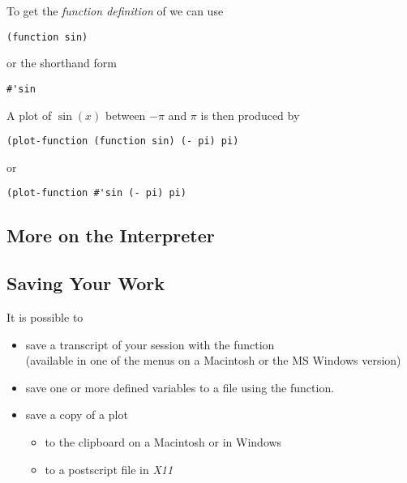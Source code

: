 \begin{slide}{}
To get the {\em function definition}\/ of  we can use
\begin{verbatim}
(function sin)
\end{verbatim}
or the shorthand form
\begin{verbatim}
#'sin
\end{verbatim}
A plot of $\sin(x)$ between $-\pi$ and $\pi$ is then produced by
{\Large
\begin{verbatim}
(plot-function (function sin) (- pi) pi)
\end{verbatim}}
or
{\Large
\begin{verbatim}
(plot-function #'sin (- pi) pi)
\end{verbatim}}
\end{slide}

\begin{slide}{}
\section{More on the Interpreter}
\subsection{Saving Your Work}
It is possible to
\begin{itemize}
\item
save a transcript of your session with the  function\\
(available in one of the menus on a Macintosh or the MS Windows
version)
\item
save one or more defined variables to a file using the 
function.
\item
save a copy of a plot
\begin{itemize}
\item to the clipboard on a Macintosh or in Windows
\item to a postscript file in {\em X11}
\end{itemize}
\end{itemize}
\end{slide}

